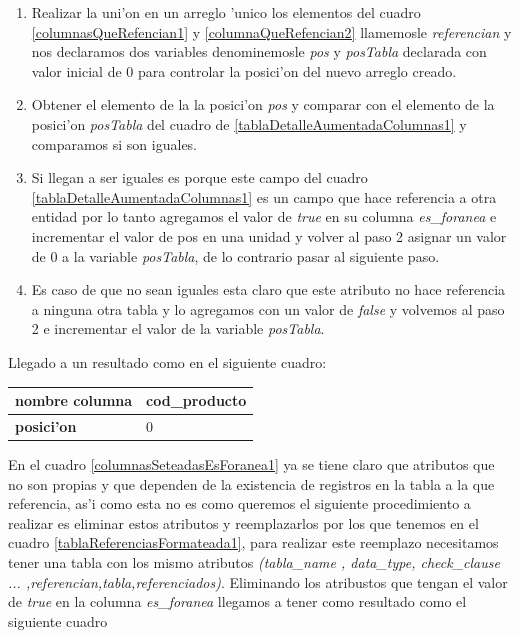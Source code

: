\begin{enumerate}
\item Realizar la uni'on en un arreglo 'unico los elementos del cuadro \ref{columnasQueRefencian1} y \ref{columnaQueRefencian2} llamemosle \textit{referencian} y nos declaramos dos variables denominemosle \textit{pos} y \textit{posTabla} declarada con valor inicial de 0 para controlar la posici'on del nuevo arreglo creado.
\item Obtener el elemento de la la posici'on \textit{pos} y comparar con el elemento de la posici'on \textit{posTabla} del cuadro de \ref{tablaDetalleAumentadaColumnas1} y comparamos si son iguales.
\item Si llegan a ser iguales es porque este campo del cuadro \ref{tablaDetalleAumentadaColumnas1} es un campo que hace referencia a otra entidad por lo tanto agregamos el valor de \textit{true} en su columna \textit{es\_foranea} e incrementar el valor de pos en una unidad y volver al paso 2 asignar un valor de 0 a la variable \textit{posTabla}, de lo contrario pasar al siguiente paso.
\item Es caso de que no sean iguales esta claro que este atributo no hace referencia a ninguna otra tabla y lo agregamos con un valor de \textit{false} y volvemos al paso 2 e incrementar el valor de la variable \textit{posTabla}.
\end{enumerate}
Llegado a un resultado como en el siguiente cuadro:

 
\begin{center}
  \label{columnasSeteadasEsForanea1} %
  \begin{tabular}{|l|l|}
  \hline 
  \textbf{nombre columna} & cod\_producto \\ \hline
  \textbf{posici'on}      & 0             \\ \hline
  \end{tabular}
\end{center}

En el cuadro \ref{columnasSeteadasEsForanea1} ya se tiene claro que atributos que no son propias y que dependen de la existencia de registros en la tabla a la que referencia, as'i como esta no es como queremos el siguiente procedimiento a realizar es eliminar estos atributos y reemplazarlos por los que tenemos en el cuadro \ref{tablaReferenciasFormateada1}, para realizar este reemplazo necesitamos tener una tabla con los mismo atributos \textit{(tabla\_name , data\_type, check\_clause ... ,referencian,tabla,referenciados)}. Eliminando los atribustos que tengan el valor de \textit{true} en la columna \textit{es\_foranea} llegamos a tener como resultado como el siguiente cuadro

